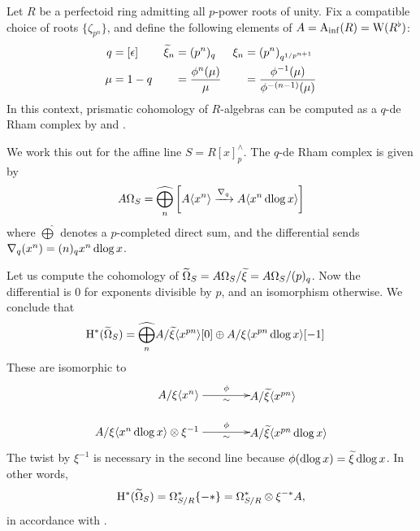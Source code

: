 \begin{example}
  \label{ex:cartier}
  Let $R$ be a perfectoid ring admitting all $p$-power roots of unity. Fix a compatible choice of roots $\{\zeta_{p^n}\}$, and define the following elements of $A=\Ainf(R)=\rmW(R^\flat)$:
  \begin{align*}
    q &= [\epsilon] & \~\xi_n &= (p^n)_q & \xi_n &= (p^n)_{q^{1/p^{n+1}}}\\
    \mu &= 1-q &&= \frac{\phi^n(\mu)}\mu &&= \frac{\phi^{-1}(\mu)}{\phi^{-(n-1)}(\mu)}
  \end{align*}
  In this context, prismatic cohomology of $R$-algebras can be computed as a $q$-de Rham complex by \cite[Lemma 9.6]{BMS1} and \cite[Theorem 17.2]{Prismatic}.

  We work this out for the affine line $S=R[x]^\land_p$. The $q$-de Rham complex is given by
  \[ \AOmega_S = \widehat{\bigoplus_n} \left[A{\<x^n\>} \xra{\nabla_q} A{\<x^n\dlog x\>}\right] \]
  where $\widehat\bigoplus$ denotes a $p$-completed direct sum, and the differential sends $\nabla_q(x^n) = (n)_q x^n \dlog x$.

  Let us compute the cohomology of $\~\Omega_S = \AOmega_S/\~\xi = \AOmega_S/(p)_q$. Now the differential is $0$ for exponents divisible by $p$, and an isomorphism otherwise. We conclude that
  \begin{align*}
    \H^*(\~\Omega_S) &= \widehat{\bigoplus_n} A/\~\xi{\<x^{pn}\>}[0] \oplus A/\xi{\<x^{pn}\dlog x\>}[-1]
  \end{align*}
  These are isomorphic to
  \[\xymatrix@R=2em@C=-4em{
      *!R{A/\xi{\<x^n\>}\ } \ar[r]^-\phi_-\sim & *!L{A/\~\xi{\<x^{pn}\>}}\\
      *!R{A/\xi{\<x^n\dlog x\>}\tnsr \xi^{-1}\ } \ar[r]^-\phi_-\sim & *!L{A/\~\xi{\<x^{pn}\dlog x\>}}
  }\]
  The twist by $\xi^{-1}$ is necessary in the second line because $\phi(\dlog x)=\~\xi\dlog x$. In other words,
  \[ \H^*(\~\Omega_S) = \Omega^*_{S/R}\{-*\}=\Omega^*_{S/R}\tnsr \xi^{-*}A, \]
  in accordance with \cite[Theorem 8.7]{BMS1}.


\end{example}
